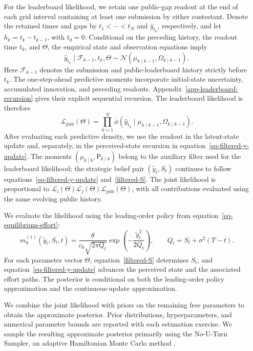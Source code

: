 \documentclass[mnsc]{informs3}
\begin{document}
For the leaderboard likelihood, we retain one public-gap readout at the end of each grid interval containing at least one submission by either contestant. Denote the retained times and gaps by $t_1<\cdots<t_N$ and $\hat y_{t_k}$, respectively, and let $h_k=t_k-t_{k-1}$, with $t_0=0$. Conditional on the preceding history, the readout time $t_k$, and $\Theta$, the empirical state and observation equations imply
\[
{\hat y_{t_k}\mid\mathcal F_{k-1},t_k,\Theta}
\sim
\mathcal N\!\left(\mu_{k\mid k-1},\Omega_{k\mid k-1}\right),
\]
{Here $\mathcal F_{k-1}$ denotes the submission and public-leaderboard history strictly before $t_k$. The one-step-ahead predictive moments incorporate initial-state uncertainty, accumulated innovation, and preceding readouts. Appendix~\ref{app-leaderboard-recursion} gives their explicit sequential recursion. The leaderboard likelihood is therefore}
\begin{equation}\label{eq-obs_gap-prob}
{\mathcal L_{\mathrm{pub}}(\Theta)}
=
\prod_{k=1}^N
\phi\left(\hat y_{t_k}\mid\mu_{k\mid k-1},\Omega_{k\mid k-1}\right).
\end{equation}
{After evaluating each predictive density, we use the readout in the latent-state update and, separately, in the perceived-state recursion in equation~\eqref{eq-filtered-y-update}. The moments $(\mu_{k\mid k},\mathsf P_{k\mid k})$ belong to the auxiliary filter used for the leaderboard likelihood; the strategic belief pair $(\tilde y_t,S_t)$ continues to follow equations~\eqref{eq-filtered-y-update} and~\eqref{filtered-S}. The joint likelihood is proportional to $\mathcal L_i(\Theta)\mathcal L_j(\Theta)\mathcal L_{\mathrm{pub}}(\Theta)$, with all contributions evaluated using the same evolving public history.}

{We evaluate the likelihood using the leading-order policy from equation~\eqref{eq-equilibrium-effort}:}
\begin{equation}\label{eq-empirical-leading-effort}
{m_k^{(1)}(\tilde y_t,S_t,t)
=\frac{\theta}{c_k\sqrt{2\pi Q_t}}
\exp\!\left(-\frac{\tilde y_t^2}{2Q_t}\right),
\qquad Q_t=S_t+\sigma^2(T-t).}
\end{equation}
{For each parameter vector $\Theta$, equation~\eqref{filtered-S} determines $S_t$, and equation~\eqref{eq-filtered-y-update} advances the perceived state and the associated effort paths. The posterior is conditional on both the leading-order policy approximation and the continuous-update approximation.}

We combine the joint likelihood with priors on the remaining free parameters to obtain the approximate posterior. Prior distributions, hyperparameters, and numerical parameter bounds are reported with each estimation exercise.
We sample the resulting approximate posterior primarily using the No-U-Turn Sampler, an adaptive Hamiltonian Monte Carlo method \citep{hoffman2014NUTS}.
\end{document}
